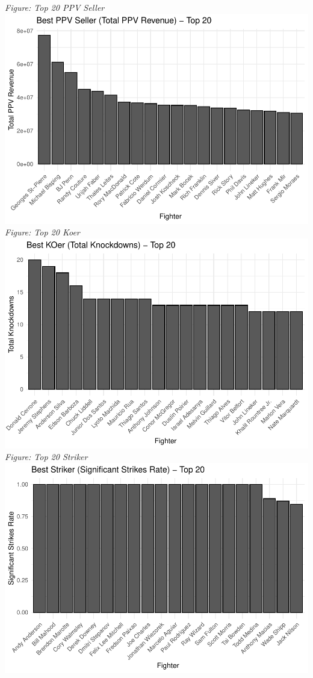 \documentclass[
  man,floatsintext]{apa6}
\begin{document}
\emph{Figure: Top 20 PPV Seller}
\includegraphics{Into-the-UFC--outline-_files/figure-latex/unnamed-chunk-3-1.pdf}
\emph{Figure: Top 20 Koer}
\includegraphics{Into-the-UFC--outline-_files/figure-latex/unnamed-chunk-4-1.pdf}
\emph{Figure: Top 20 Striker}
\includegraphics{Into-the-UFC--outline-_files/figure-latex/unnamed-chunk-5-1.pdf}
\end{document}

